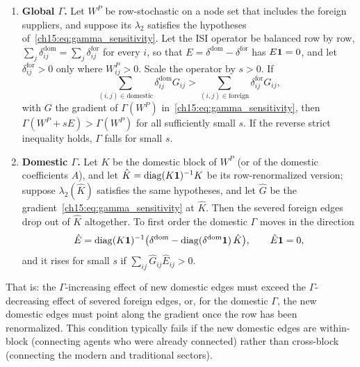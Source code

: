 \documentclass[../structural_economics_book.tex]{subfiles}
\begin{document}
\begin{proposition}\label{ch15:prop:isi_gamma}
\begin{enumerate}
\item \textbf{Global $\Gamma$.} Let $W^P$ be row-stochastic on a node set that includes the foreign suppliers, and suppose its $\lambda_2$ satisfies the hypotheses of~\eqref{ch15:eq:gamma_sensitivity}. Let the ISI operator be balanced row by row, $\sum_j \delta^{\text{dom}}_{ij} = \sum_j \delta^{\text{for}}_{ij}$ for every $i$, so that $E = \delta^{\text{dom}} - \delta^{\text{for}}$ has $E\mathbf{1} = 0$, and let $\delta^{\text{for}}_{ij} > 0$ only where $W^P_{ij} > 0$. Scale the operator by $s > 0$. If
\begin{equation}\label{ch15:eq:isi_condition}
\sum_{(i,j) \in \text{domestic}} \delta_{ij}^{\text{dom}} G_{ij} > \sum_{(i,j) \in \text{foreign}} \delta_{ij}^{\text{for}} G_{ij},
\end{equation}
with $G$ the gradient of $\Gamma(W^P)$ in~\eqref{ch15:eq:gamma_sensitivity}, then $\Gamma(W^P + sE) > \Gamma(W^P)$ for all sufficiently small $s$. If the reverse strict inequality holds, $\Gamma$ falls for small $s$.
\item \textbf{Domestic $\Gamma$.} Let $K$ be the domestic block of $W^P$ (or of the domestic coefficients $A$), and let $\hat K = \operatorname{diag}(K\mathbf{1})^{-1}K$ be its row-renormalized version; suppose $\lambda_2(\hat K)$ satisfies the same hypotheses, and let $\hat G$ be the gradient~\eqref{ch15:eq:gamma_sensitivity} at $\hat K$. Then the severed foreign edges drop out of $\hat K$ altogether. To first order the domestic $\Gamma$ moves in the direction
\begin{equation}\label{ch15:eq:isi_domestic}
\hat E = \operatorname{diag}(K\mathbf{1})^{-1}\big(\delta^{\text{dom}} - \operatorname{diag}(\delta^{\text{dom}}\mathbf{1})\,\hat K\big), \qquad \hat E\mathbf{1} = 0,
\end{equation}
and it rises for small $s$ if $\sum_{ij}\hat G_{ij}\hat E_{ij} > 0$.
\end{enumerate}
That is: the $\Gamma$-increasing effect of new domestic edges must exceed the $\Gamma$-decreasing effect of severed foreign edges, or, for the domestic $\Gamma$, the new domestic edges must point along the gradient once the row has been renormalized. This condition typically fails if the new domestic edges are within-block (connecting agents who were already connected) rather than cross-block (connecting the modern and traditional sectors).
\end{proposition}
\end{document}
